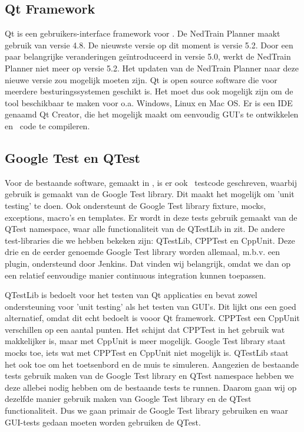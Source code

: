 \subsection{Qt Framework}
Qt is een gebruikers-interface framework voor \cpp. De NedTrain Planner maakt gebruik van versie 4.8. De nieuwste versie op dit moment is versie 5.2. Door een paar belangrijke veranderingen ge\"introduceerd in versie 5.0, werkt de NedTrain Planner niet meer op versie 5.2. Het updaten van de NedTrain Planner naar deze nieuwe versie zou mogelijk moeten zijn. Qt is open source software die voor meerdere besturingssystemen geschikt is. Het moet dus ook mogelijk zijn om de tool beschikbaar te maken voor o.a. Windows, Linux en Mac OS. Er is een IDE genaamd Qt Creator, die het mogelijk maakt om eenvoudig GUI's te ontwikkelen en \cpp\ code te compileren.

\subsection{Google Test en QTest}
Voor de bestaande software, gemaakt in \cpp, is er ook \cpp\ testcode geschreven, waarbij gebruik is gemaakt van de Google Test library. Dit maakt het mogelijk om 'unit testing' te doen. Ook ondersteunt de Google Test library fixture, mocks, exceptions, macro's en templates. Er wordt in deze tests gebruik gemaakt van de QTest namespace, waar alle functionaliteit van de QTestLib in zit. De andere test-libraries die we hebben bekeken zijn: QTestLib, CPPTest en CppUnit. Deze drie en de eerder genoemde Google Test library worden allemaal, m.b.v. een plugin, ondersteund door Jenkins. Dat vinden wij belangrijk, omdat we dan op een relatief eenvoudige manier continuous integration kunnen toepassen. 

QTestLib is bedoelt voor het testen van Qt applicaties en bevat zowel ondersteuning voor 'unit testing' als het testen van GUI's. Dit lijkt ons een goed alternatief, omdat dit echt bedoelt is vooor Qt framework. CPPTest een CppUnit verschillen op een aantal punten. Het schijnt dat CPPTest in het gebruik wat makkelijker is, maar met CppUnit is meer mogelijk. Google Test library staat mocks toe, iets wat met CPPTest en CppUnit niet mogelijk is. QTestLib staat het ook toe om het toetsenbord en de muis te simuleren. Aangezien de bestaande tests gebruik maken van de Google Test library en QTest namespace hebben we deze allebei nodig hebben om de bestaande tests te runnen. Daarom gaan wij op dezelfde manier gebruik maken van Google Test library en de QTest functionaliteit. Dus we gaan primair de Google Test library gebruiken en waar GUI-tests gedaan moeten worden gebruiken de QTest. 

